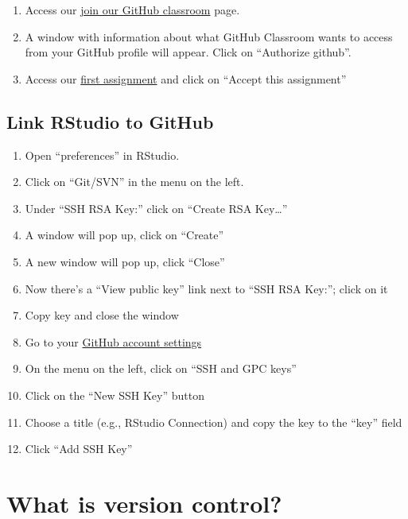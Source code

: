 \documentclass[
]{book}
\begin{document}
\begin{enumerate}
\def\labelenumi{\arabic{enumi}.}
\item
  Access our \href{https://classroom.github.com/classrooms/69162822-esoc214-classroom-1}{join our GitHub classroom} page.
\item
  A window with information about what GitHub Classroom wants to access from your GitHub profile will appear. Click on ``Authorize github''.
\item
  Access our \href{https://classroom.github.com/a/uE1b8ho7}{first assignment} and click on ``Accept this assignment''
\end{enumerate}

\hypertarget{link-rstudio-to-github}{%
\subsection{Link RStudio to GitHub}\label{link-rstudio-to-github}}

\begin{enumerate}
\def\labelenumi{\arabic{enumi}.}
\item
  Open ``preferences'' in RStudio.
\item
  Click on ``Git/SVN'' in the menu on the left.
\item
  Under ``SSH RSA Key:'' click on ``Create RSA Key\ldots{}''
\item
  A window will pop up, click on ``Create''
\item
  A new window will pop up, click ``Close''
\item
  Now there's a ``View public key'' link next to ``SSH RSA Key:''; click on it
\item
  Copy key and close the window
\item
  Go to your \href{https://github.com/settings/profile}{GitHub account settings}
\item
  On the menu on the left, click on ``SSH and GPC keys''
\item
  Click on the ``New SSH Key'' button
\item
  Choose a title (e.g., RStudio Connection) and copy the key to the ``key'' field
\item
  Click ``Add SSH Key''
\end{enumerate}

\hypertarget{what-is-version-control}{%
\section{What is version control?}\label{what-is-version-control}}
\end{document}
